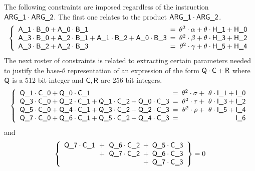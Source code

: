 The following constraints are imposed regardless of the instruction $\textsf{ARG}\textsf{\_1} \cdot \textsf{ARG}\textsf{\_2}$.
The first one relates to the product $\textsf{ARG}\textsf{\_1} \cdot \textsf{ARG}\textsf{\_2}$.
\[
	\left\{ \begin{array}{lcr}
		\col{A\_1} \cdot \col{B\_0} + \col{A\_0} \cdot \col{B\_1}                                                             & \!\!\! = \!\!\! & \theta^2 \cdot \alpha + \theta \cdot \col{H\_1} + \col{H\_0} \\
		\col{A\_3} \cdot \col{B\_0} + \col{A\_2} \cdot \col{B\_1} + \col{A\_1} \cdot \col{B\_2} + \col{A\_0} \cdot \col{B\_3} & \!\!\! = \!\!\! & \theta^2 \cdot \beta + \theta \cdot \col{H\_3} + \col{H\_2}  \\
		\col{A\_3} \cdot \col{B\_2} + \col{A\_2} \cdot \col{B\_3}                                                             & \!\!\! = \!\!\! & \theta^2 \cdot \gamma + \theta \cdot \col{H\_5} + \col{H\_4} \\
	\end{array} \right.
\]
\noindent The next roster of constraints is related to extracting certain parameters needed to justify the base-$\theta$ representation of an expression of the form $\textsf{Q} \cdot \textsf{C} + \textsf{R}$ where
$\textsf{Q}$ is a 512 bit integer and
$\textsf{C}, \textsf{R}$ are 256 bit integers.
\[
	\left\{ \begin{array}{lcr}
		\col{Q\_1} \cdot \col{C\_0} + \col{Q\_0} \cdot \col{C\_1}                                                             & \!\!\! = \!\!\! & \theta^2 \cdot \sigma + \,\, \theta \cdot \col{I\_1} + \col{I\_0} \\
		\col{Q\_3} \cdot \col{C\_0} + \col{Q\_2} \cdot \col{C\_1} + \col{Q\_1} \cdot \col{C\_2} + \col{Q\_0} \cdot \col{C\_3} & \!\!\! = \!\!\! & \theta^2 \cdot \tau + \,\, \theta \cdot \col{I\_3} + \col{I\_2}   \\
		\col{Q\_5} \cdot \col{C\_0} + \col{Q\_4} \cdot \col{C\_1} + \col{Q\_3} \cdot \col{C\_2} + \col{Q\_2} \cdot \col{C\_3} & \!\!\! = \!\!\! & \theta^2 \cdot \rho + \,\, \theta \cdot \col{I\_5} + \col{I\_4}   \\
		\col{Q\_7} \cdot \col{C\_0} + \col{Q\_6} \cdot \col{C\_1} + \col{Q\_5} \cdot \col{C\_2} + \col{Q\_4} \cdot \col{C\_3} & \!\!\! = \!\!\! & \col{I\_6}                                                        \\
	\end{array} \right.
\]
and
\[
	\left\{ \begin{array}{rcrcr}
		\col{Q\_7} \cdot \col{C\_1} & \!\!\!+\!\!\! & \col{Q\_6} \cdot \col{C\_2} & \!\!\!+\!\!\! & \col{Q\_5} \cdot \col{C\_3} \\
                                            & \!\!\!+\!\!\! & \col{Q\_7} \cdot \col{C\_2} & \!\!\!+\!\!\! & \col{Q\_6} \cdot \col{C\_3} \\
                                            &               &                             & \!\!\!+\!\!\! & \col{Q\_7} \cdot \col{C\_3} \\
	\end{array} \right\}
	= 0
\]
